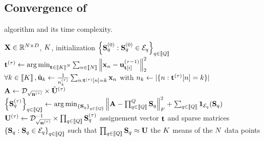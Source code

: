 \subsection{Convergence of \qkmeans}


\begin{algorithm}[t]
	\caption{\qkmeans algorithm and its time complexity.}
	\label{algo:qmeans}
	\begin{algorithmic}[1]
		
		
		\REQUIRE ${\mathbf{X}} \in \mathbb{R}^{N \times D}$, $K$, initialization $\left \lbrace {\mathbf{S}}_q^{(0)} : {\mathbf{S}}_q^{(0)} \in \mathcal{E}_q\right \rbrace_{q\in\left \llbracket Q\right \rrbracket}$
		\STATE ${\mathbf{t}}^{(\tau)} \leftarrow \operatorname*{arg\,min}_{{\mathbf{t}} \in \left \llbracket K\right \rrbracket^N} \sum_{n\in\left \llbracket N\right \rrbracket} {\left \|{\mathbf{x}}_n - {\mathbf{u}}^{(\tau -1)}_{{\mathbf{t}}[i]}\right \|_2^2}$
		\label{line:qmeans:assignment}
		\STATE $\forall k\in\left \llbracket K\right \rrbracket, \hat{{\mathbf{u}}}_k \leftarrow \frac{1}{n_k^{(\tau)}} \sum_{n: {\mathbf{t}}^{(\tau)}[n]= k} {{\mathbf{x}}_n}$
with $n_k \leftarrow |\{n: {\mathbf{t}}^{(\tau)}[n]=k\}|$
		\COMMENT{$\bigO{\nexamples\datadim}$}
		\STATE ${\mathbf{A}} \leftarrow \mathcal{D}_{\sqrt{{\mathbf{n}}^{(\tau)}}} \times \hat{{\mathbf{U}}}^{(\tau)} $
		\COMMENT{$\bigO{\nclusters\datadim}$}
		\STATE $\left \lbrace {\mathbf{S}}_q^{(\tau)}\right \rbrace_{q\in\left \llbracket Q\right \rrbracket} \leftarrow \operatorname*{arg\,min}_{\left \lbrace {\mathbf{S}}_q\right \rbrace_{q\in\left \llbracket Q\right \rrbracket}} \left \|{\mathbf{A}} - \prod_{q\in\left \llbracket Q\right \rrbracket}^{Q}{{\mathbf{S}}_q}\right \|_F^2 + \sum_{q\in\left \llbracket Q\right \rrbracket} \mathbf{1}_{\mathcal{E}_q}({\mathbf{S}}_q)$\\
		\STATE ${\mathbf{U}}^{(\tau)} \leftarrow \mathcal{D}_{\sqrt{{\mathbf{n}}^{(\tau)}}}^{-1} \times \prod_{q\in\left \llbracket Q\right \rrbracket}{{\mathbf{S}}_q^{(\tau)}}$
		\ENDFOR
		\ENSURE assignement vector ${\mathbf{t}}$ and sparse matrices $\left \lbrace {\mathbf{S}}_q : {\mathbf{S}}_q \in \mathcal{E}_q\right \rbrace_{q\in\left \llbracket Q\right \rrbracket}$ such that $\prod_{q\in\left \llbracket Q\right \rrbracket}{\mathbf{S}}_q \approx {\mathbf{U}}$ the $K$ means of the $N$ data points
	\end{algorithmic}
\end{algorithm}

